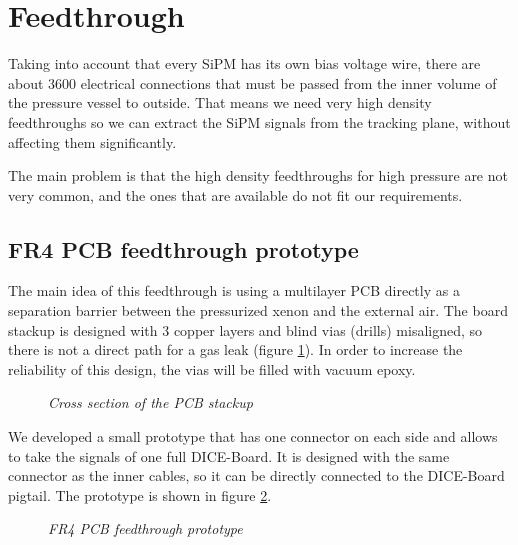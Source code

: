 \section{Feedthrough}
Taking into account that every SiPM has its own bias voltage wire, there are about $3600$ electrical connections that must be passed from the inner volume of the pressure vessel to outside. That means we need very high density feedthroughs so we can extract the SiPM signals from the tracking plane, without affecting them significantly.

The main problem is that the high density feedthroughs for high pressure are not very common, and the ones that are available do not fit our requirements.

\subsection{FR4 PCB feedthrough prototype}

The main idea of this feedthrough is using a multilayer PCB directly as a separation barrier between the pressurized xenon and the external air. The board stackup is designed with $3$ copper layers and blind vias (drills) misaligned, so there is not a direct path for a gas leak (figure \ref{fig:ft:pcb}). In order to increase the reliability of this design, the vias will be filled with vacuum epoxy.

\begin{figure}[ht]
    \bigskip
    \begin{center}\leavevmode
        \caption{\textit{Cross section of the PCB stackup}}
        \label{fig:ft:pcb}
    \end{center}
\end{figure}

We developed a small prototype that has one connector on each side and allows to take the signals of one full DICE-Board. It is designed with the same connector as the inner cables, so it can be directly connected to the DICE-Board pigtail. The prototype is shown in figure \ref{fig:ft:pcb2}.

\begin{figure}[ht]
  \centering
  \hspace{10mm}             
  \caption{\textit{FR4 PCB feedthrough prototype}}
  \label{fig:ft:pcb2}
\end{figure}

